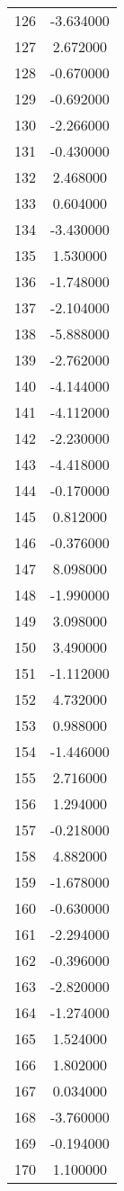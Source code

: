 \documentclass[12pt]{article}
\begin{document}
\begin{longtable}{@{}cc@{}}
126 & -3.634000 \\
127 & 2.672000 \\
128 & -0.670000 \\
129 & -0.692000 \\
130 & -2.266000 \\
131 & -0.430000 \\
132 & 2.468000 \\
133 & 0.604000 \\
134 & -3.430000 \\
135 & 1.530000 \\
136 & -1.748000 \\
137 & -2.104000 \\
138 & -5.888000 \\
139 & -2.762000 \\
140 & -4.144000 \\
141 & -4.112000 \\
142 & -2.230000 \\
143 & -4.418000 \\
144 & -0.170000 \\
145 & 0.812000 \\
146 & -0.376000 \\
147 & 8.098000 \\
148 & -1.990000 \\
149 & 3.098000 \\
150 & 3.490000 \\
151 & -1.112000 \\
152 & 4.732000 \\
153 & 0.988000 \\
154 & -1.446000 \\
155 & 2.716000 \\
156 & 1.294000 \\
157 & -0.218000 \\
158 & 4.882000 \\
159 & -1.678000 \\
160 & -0.630000 \\
161 & -2.294000 \\
162 & -0.396000 \\
163 & -2.820000 \\
164 & -1.274000 \\
165 & 1.524000 \\
166 & 1.802000 \\
167 & 0.034000 \\
168 & -3.760000 \\
169 & -0.194000 \\
170 & 1.100000 \\

\end{longtable}
\end{document}
